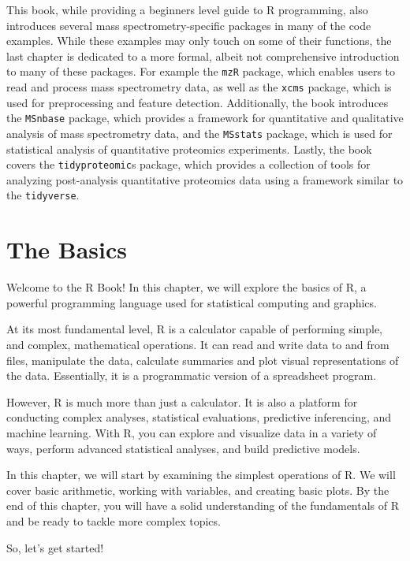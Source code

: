 \documentclass[
]{book}
\begin{document}
This book, while providing a beginners level guide to R programming, also introduces several mass spectrometry-specific packages in many of the code examples. While these examples may only touch on some of their functions, the last chapter is dedicated to a more formal, albeit not comprehensive introduction to many of these packages. For example the \texttt{mzR} package, which enables users to read and process mass spectrometry data, as well as the \texttt{xcms} package, which is used for preprocessing and feature detection. Additionally, the book introduces the \texttt{MSnbase} package, which provides a framework for quantitative and qualitative analysis of mass spectrometry data, and the \texttt{MSstats} package, which is used for statistical analysis of quantitative proteomics experiments. Lastly, the book covers the \texttt{tidyproteomic}s package, which provides a collection of tools for analyzing post-analysis quantitative proteomics data using a framework similar to the \texttt{tidyverse}.

\hypertarget{the-basics}{%
\chapter{The Basics}\label{the-basics}}

Welcome to the R Book! In this chapter, we will explore the basics of R, a powerful programming language used for statistical computing and graphics.

At its most fundamental level, R is a calculator capable of performing simple, and complex, mathematical operations. It can read and write data to and from files, manipulate the data, calculate summaries and plot visual representations of the data. Essentially, it is a programmatic version of a spreadsheet program.

However, R is much more than just a calculator. It is also a platform for conducting complex analyses, statistical evaluations, predictive inferencing, and machine learning. With R, you can explore and visualize data in a variety of ways, perform advanced statistical analyses, and build predictive models.

In this chapter, we will start by examining the simplest operations of R. We will cover basic arithmetic, working with variables, and creating basic plots. By the end of this chapter, you will have a solid understanding of the fundamentals of R and be ready to tackle more complex topics.

So, let's get started!
\end{document}

